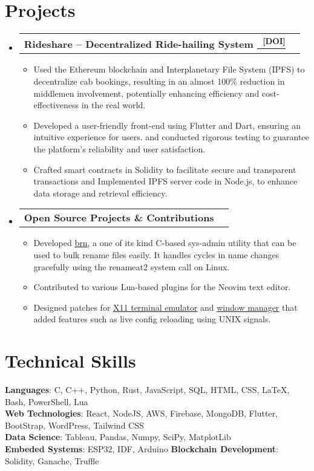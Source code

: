 \documentclass[letterpaper,11pt]{article}
\makeatletter
\newcommand{\resumeItem}[1]{
  \item\small{
    {#1 \vspace{-2pt}}
  }
}
\newcommand{\resumeProjectHeading}[2]{
    \item
    \begin{tabular*}{1.001\textwidth}{l@{\extracolsep{\fill}}r}
      \small#1 & \textbf{\small #2}\\
    \end{tabular*}\vspace{-7pt}
}
\newcommand{\resumeSubHeadingListStart}{\begin{itemize}[leftmargin=0.0in, label={}]}
\newcommand{\resumeSubHeadingListEnd}{\end{itemize}}
\newcommand{\resumeItemListStart}{\begin{itemize}}
\newcommand{\resumeItemListEnd}{\end{itemize}\vspace{-5pt}}
\makeatother
\begin{document}
\section{Projects}
\vspace{-5pt}
\resumeSubHeadingListStart
\resumeProjectHeading
{\textbf{Rideshare -- Decentralized Ride-hailing System
      {\href{https://ieeexplore.ieee.org/document/10037296}{\
          \underline{\textsuperscript{[DOI]}}}}}}{}
\resumeItemListStart
\resumeItem{Used the Ethereum blockchain and Interplanetary File
  System (IPFS) to decentralize cab bookings, resulting in an almost
  100\% reduction in middlemen involvement, potentially enhancing
  efficiency and cost-effectiveness in the real world.}
\resumeItem{Developed a user-friendly front-end using Flutter and
  Dart, ensuring an intuitive experience for users. and conducted
  rigorous testing to guarantee the platform's reliability and user
  satisfaction.}
\resumeItem{Crafted smart contracts in Solidity to facilitate
  secure and transparent transactions and Implemented IPFS server
  code in Node.js, to enhance data storage and retrieval efficiency.}
\resumeItemListEnd
\vspace{-13pt}
\resumeProjectHeading
{\textbf{Open Source Projects \& Contributions}}{}
\resumeItemListStart
\resumeItem{Developed {\href{https://www.github.com/nimaipatel/brn}{\underline{brn}}{}}, a one of its kind C-based sys-admin utility that can be used to bulk rename files easily. It handles cycles in name changes gracefully using the renameat2 system call on Linux.}
\resumeItem{Contributed to various Lua-based plugins for the Neovim text editor.}
\resumeItem{Designed patches for {\href{https://www.github.com/nimaipatel/st}{\underline{X11 terminal emulator}}} and \href{https://www.github.com/nimaipatel/dwm}{\underline{window manager}} that added features such as live config reloading using UNIX signals.}
\resumeItemListEnd
\vspace{-13pt}
\resumeSubHeadingListEnd
\vspace{-2pt}

%
\section{Technical Skills}
\begin{itemize}[leftmargin=0.15in, label={}]
  \small{\item{
                \textbf{Languages}{: C, C++, Python, Rust, JavaScript, SQL, HTML, CSS, {\LaTeX}, Bash, PowerShell, Lua} \\
                \textbf{Web Technologies}{: React, NodeJS, AWS, Firebase, MongoDB, Flutter, BootStrap, WordPress, Tailwind CSS} \\
                \textbf{Data Science}{: Tableau, Pandas, Numpy, SciPy, MatplotLib} \\
                \textbf{Embeded Systems}{: ESP32, IDF, Arduino}
                \hspace{1em}
                \textbf{Blockchain Development}{: Solidity, Ganache, Truffle} \\
          }}
\end{itemize}
\vspace{-16pt}
\end{document}
